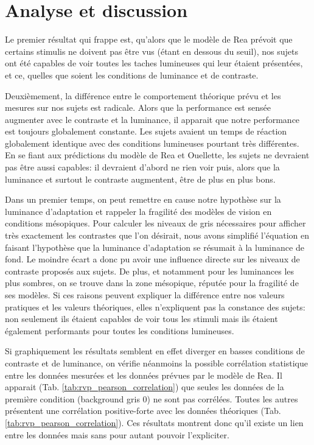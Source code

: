 	\section{Analyse et discussion}
	\par Le premier résultat qui frappe est, qu'alors que le modèle de Rea prévoit que certains stimulis ne doivent pas être vus (étant en dessous du seuil), nos sujets ont été capables de voir toutes les taches lumineuses qui leur étaient présentées, et ce, quelles que soient les conditions de luminance et de contraste.
	
	\par Deuxièmement, la différence entre le comportement théorique prévu et les mesures sur nos sujets est radicale. Alors que la performance est sensée augmenter avec le contraste et la luminance, il apparait que notre performance est toujours globalement constante. Les sujets avaient un temps de réaction globalement identique avec des conditions lumineuses pourtant très différentes. En se fiant aux prédictions du modèle de Rea et Ouellette, les sujets ne devraient pas être aussi capables: il devraient d'abord ne rien voir puis, alors que la luminance et surtout le contraste augmentent, être de plus en plus bons.
	
	\par Dans un premier temps, on peut remettre en cause notre hypothèse sur la luminance d'adaptation et rappeler la fragilité des modèles de vision en conditions mésopiques. Pour calculer les niveaux de gris nécessaires pour afficher très exactement les contrastes que l'on désirait, nous avons simplifié l'équation en faisant l'hypothèse que la luminance d'adaptation se résumait à la luminance de fond. Le moindre écart a donc pu avoir une influence directe sur les niveaux de contraste proposés aux sujets. De plus, et notamment pour les luminances les plus sombres, on se trouve dans la zone mésopique, réputée pour la fragilité de ses modèles. Si ces raisons peuvent expliquer la différence entre nos valeurs pratiques et les valeurs théoriques, elles n'expliquent pas la constance des sujets: non seulement ils étaient capables de voir tous les stimuli mais ils étaient également performants pour toutes les conditions lumineuses.
	
	\par Si graphiquement les résultats semblent en effet diverger en basses conditions de contraste et de luminance, on vérifie néanmoins la possible corrélation statistique entre les données mesurées et les données prévues par le modèle de Rea. Il apparait (Tab. \ref{tab:rvp_pearson_correlation}) que seules les données de la première condition (background gris 0) ne sont pas corrélées. Toutes les autres présentent une corrélation positive-forte avec les données théoriques (Tab. \ref{tab:rvp_pearson_correlation}). Ces résultats montrent donc qu'il existe un lien entre les données mais sans pour autant pouvoir l'expliciter.
	
